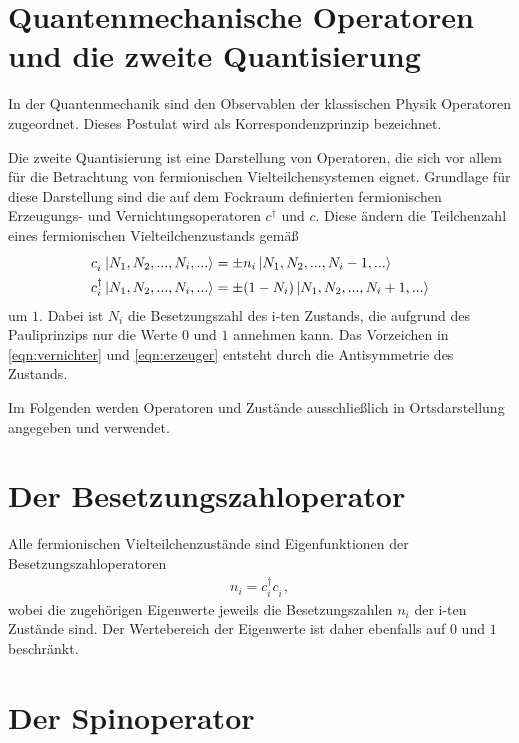 \section{Quantenmechanische Operatoren und die zweite Quantisierung}

In der Quantenmechanik sind den Observablen der klassischen Physik Operatoren zugeordnet.
Dieses Postulat wird als Korrespondenzprinzip bezeichnet.
\cite{schwabl}

Die zweite Quantisierung ist eine Darstellung von Operatoren, die sich vor allem für die Betrachtung von fermionischen Vielteilchensystemen eignet.
Grundlage für diese Darstellung sind die auf dem Fockraum definierten fermionischen Erzeugungs- und Vernichtungsoperatoren $c^\dag$ und $c$.
Diese ändern die Teilchenzahl eines fermionischen Vielteilchenzustands gemäß
\begin{align}
  c_i^{\phantom{\dag}} \ket{N_1, N_2, ..., N_i, ...} & = \pm n_i \ket{N_1, N_2, ..., N_i-1, ...} \label{eqn:vernichter}\\
  c_i^\dag \ket{N_1, N_2, ..., N_i, ...} & = \pm (1-N_i) \ket{N_1, N_2, ..., N_i+1, ...} \label{eqn:erzeuger}
\end{align}
um $1$. Dabei ist $N_i$ die Besetzungszahl des i-ten Zustands, die aufgrund des Pauliprinzips nur die Werte $0$ und $1$ annehmen kann.
Das Vorzeichen in \eqref{eqn:vernichter} und \eqref{eqn:erzeuger} entsteht durch die Antisymmetrie des Zustands. \cite{cy}

Im Folgenden werden Operatoren und Zustände ausschließlich in Ortsdarstellung angegeben und verwendet.

\section{Der Besetzungszahloperator}

Alle fermionischen Vielteilchenzustände sind Eigenfunktionen der Besetzungszahloperatoren
\begin{align}
  n_i = c_i^\dag c_i^{\phantom{\dag}},
  \label{eqn:besetzer}
\end{align}
wobei die zugehörigen Eigenwerte jeweils die Besetzungszahlen $n_i$ der i-ten Zustände sind.
Der Wertebereich der Eigenwerte ist daher ebenfalls auf $0$ und $1$ beschränkt.
\cite{cy}

\section{Der Spinoperator}

